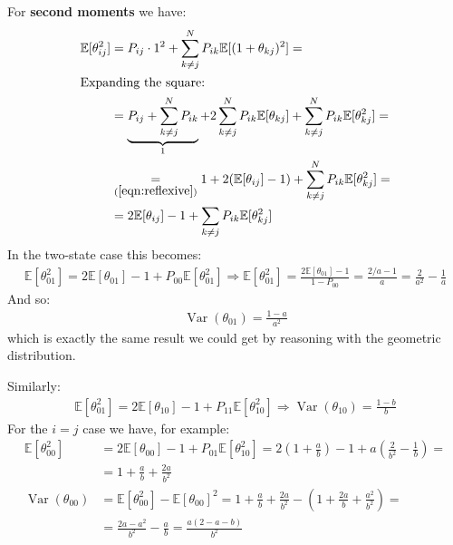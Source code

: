 \documentclass[../template.tex]{subfiles}
\begin{document}
\medskip

For \textbf{second moments} we have:
\begin{align*}
    \mathbb{E}[\theta_{ij}^2] &= P_{ij} \cdot 1^2 + \sum_{k \neq j}^N P_{ik} \mathbb{E}[(1+ \theta_{kj})^2] =\\
    \shortintertext{Expanding the square:}
    &= \underbrace{P_{ij} + \sum_{k \neq j}^N P_{ik}}_{1} + 2 \sum_{k\neq j}^N P_{ik} \mathbb{E}[\theta_{kj}] + \sum_{k \neq j}^N P_{ik} \mathbb{E}[\theta_{kj}^2] =\\
    &\underset{(\ref{eqn:reflexive})}{=}  1 + 2(\mathbb{E}[\theta_{ij}]-1) + \sum_{k \neq j}^N P_{ik} \mathbb{E}[\theta_{kj}^2] =\\
    &= 2 \mathbb{E}[\theta_{ij}] - 1 + \sum_{k \neq j} P_{ik} \mathbb{E}[\theta_{kj}^2]
\end{align*} 
In the two-state case this becomes:
\begin{align*}
    \mathbb{E}[\theta_{01}^2] = 2 \mathbb{E}[\theta_{01}] - 1 + P_{00} \mathbb{E}[\theta_{01}^2] \Rightarrow \mathbb{E}[\theta_{01}^2] = \frac{2 \mathbb{E}[\theta_{01}]-1}{1- P_{00}} = \frac{2/a - 1}{a} = \frac{2}{a^2} - \frac{1}{a}  
\end{align*}
And so:
\begin{align*}
    \operatorname{Var}(\theta_{01}) = \frac{1-a}{a^2}  
\end{align*}
which is exactly the same result we could get by reasoning with the geometric distribution.

Similarly:
\begin{align*}
    \mathbb{E}[\theta_{01}^2] = 2 \mathbb{E}[\theta_{10}] - 1 + P_{11} \mathbb{E}[\theta_{10}^2] \Rightarrow \operatorname{Var}(\theta_{10})  = \frac{1-b}{b} 
\end{align*}
For the $i=j$ case we have, for example:
\begin{align*}
    \mathbb{E}[\theta_{00}^2] &= 2\mathbb{E}[\theta_{00}] - 1 + P_{01} \mathbb{E}[\theta_{10}^2] = 2\left(1 + \frac{a}{b} \right) -1 + a\left(\frac{2}{b^2}-\frac{1}{b}  \right) =\\
    &= 1 +\frac{a}{b} +\frac{2a}{b^2} \\
    \operatorname{Var}(\theta_{00}) &= \mathbb{E}[\theta_{00}^2] - \mathbb{E}[\theta_{00}]^2 =  1 + \frac{a}{b} + \frac{2a}{b^2} - \left(1 + \frac{2a}{b} + \frac{a^2}{b^2}  \right)  =\\
    &= \frac{2a - a^2}{b^2} - \frac{a}{b} = \frac{a(2-a-b)}{b^2}   
\end{align*}
\end{document}
